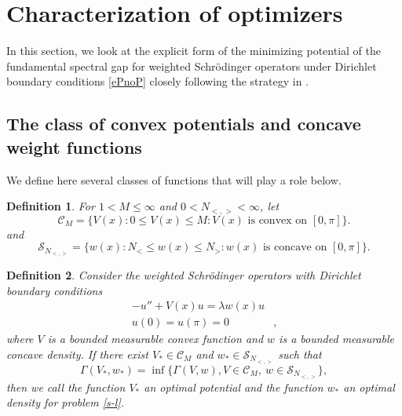\documentclass[12pt,a4paper]{amsart}
\newtheorem{defi}{Definition}[section]
\begin{document}







\section{Characterization of optimizers}
 In this section, we look at the explicit form of the minimizing potential of the fundamental spectral gap for weighted Schr\"{o}dinger operators under Dirichlet boundary conditions {\eqref{ePnoP}} 
{closely following the strategy in \cite{ElAHar}.}



\subsection{The class of convex potentials and concave weight functions}

 We define here several classes of functions that will play a role below.

\begin{defi}

For $1<M \le \infty$ and $0 < N_{<,>} < \infty $, let
$$ \mathcal{C}_M=\lbrace V(x): 0\le V(x)\le M : V(x) 
\textrm{ is convex on }[0,\pi] \rbrace .$$
and
$$ \mathcal{S}_{N_{<,>}}=\lbrace w(x):  N_< \leq w(x) \leq N_>: w(x) 
\textrm{ is concave on }[0,\pi] \rbrace .$$
\end{defi}



\begin{defi}
Consider the weighted Schr\"{o}dinger operators with Dirichlet boundary conditions
\begin{align}\label{s-l}
    {-u''+V(x)u=\lambda w(x)u}&\\
    u(0)=u(\pi)=0&,\nonumber
\end{align}                                                   
where $V$ is a bounded measurable convex function and $w$ is a bounded measurable concave density.
If there exist $V_{*} \in \mathcal{C}_M$ and 
$w_{*} \in  \mathcal{S}_{N_{<,>}}$ such that
\[
\Gamma(V_{*},w_{*})= \inf \lbrace
  \Gamma(V,w),V \in \mathcal{C}_M,
~w\in \mathcal{S}_{N_{<,>}} \rbrace,
\]
then we call the function $V_{*}$ an {\rm optimal potential} and the function  $w_{*}$ an {\rm optimal density} for problem \eqref{s-l}.
\end{defi}
\end{document}
